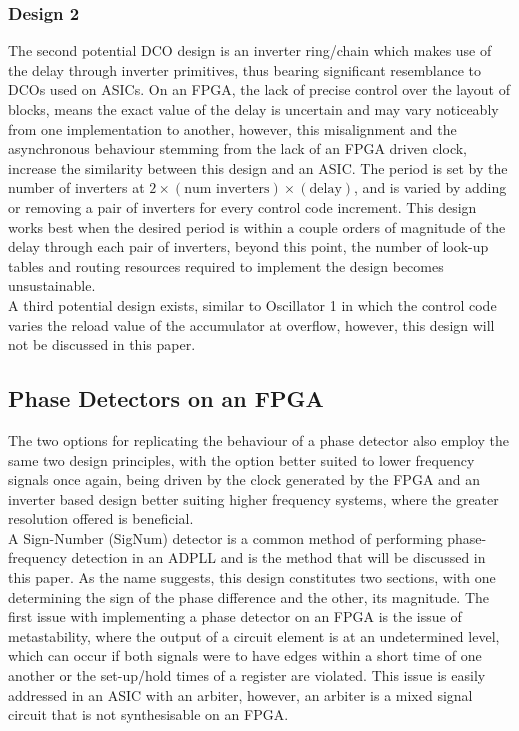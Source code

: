 \documentclass[conference]{IEEEtran}
\begin{document}
\subsubsection*{Design 2}
The second potential DCO design is an inverter ring/chain which makes use of the delay through inverter primitives, thus bearing significant resemblance to DCOs used on ASICs. On an FPGA, the lack of precise control over the layout of blocks, means the exact value of the delay is uncertain and may vary noticeably from one implementation to another, however, this misalignment and the asynchronous behaviour stemming from the lack of an FPGA driven clock, increase the similarity between this design and an ASIC. The period is set by the number of inverters at $2\times(\textrm{num inverters})\times(\textrm{delay})$, and is varied by adding or removing a pair of inverters for every control code increment. This design works best when the desired period is within a couple orders of magnitude of the delay through each pair of inverters, beyond this point, the number of look-up tables and routing resources required to implement the design becomes unsustainable.\\
A third potential design exists, similar to Oscillator 1 in which the control code varies the reload value of the accumulator at overflow, however, this design will not be discussed in this paper.

\subsection{Phase Detectors on an FPGA}
The two options for replicating the behaviour of a phase detector also employ the same two design principles, with the option better suited to lower frequency signals once again, being driven by the clock generated by the FPGA and an inverter based design better suiting higher frequency systems, where the greater resolution offered is beneficial.\\
A  Sign-Number (SigNum) detector is a common method of performing phase-frequency detection in an ADPLL and is the method that will be discussed in this paper. As the name suggests, this design constitutes two sections, with one determining the sign of the phase difference and the other, its magnitude. The first issue with implementing a phase detector on an FPGA is the issue of metastability, where the output of a circuit element is at an undetermined level, which can occur if both signals were to have edges within a short time of one another or the set-up/hold times of a register are violated. This issue is easily addressed in an ASIC with an arbiter, however, an arbiter is a mixed signal circuit that is not synthesisable on an FPGA.
\end{document}

